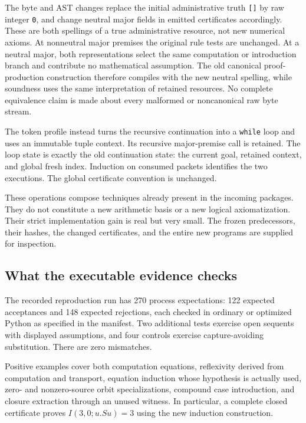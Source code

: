 The byte and AST changes replace the initial administrative truth
\texttt{[]} by raw integer \texttt{0}, and change neutral major fields
in emitted certificates accordingly. These are both spellings of a
true administrative resource, not new numerical axioms. At nonneutral
major premises the original rule tests are unchanged. At a neutral
major, both representations select the same computation or introduction
branch and contribute no mathematical assumption. The old canonical
proof-production construction therefore compiles with the new neutral
spelling, while soundness uses the same interpretation of retained
resources. No complete equivalence claim is made about every malformed
or noncanonical raw byte stream.

The token profile instead turns the recursive continuation into a
\texttt{while} loop and uses an immutable tuple context. Its recursive
major-premise call is retained. The loop state is exactly the old
continuation state: the current goal, retained context, and global fresh
index. Induction on consumed packets identifies the two executions.
The global certificate convention is unchanged.

These operations compose techniques already present in the incoming
packages. They do not constitute a new arithmetic basis or a new logical
axiomatization. Their strict implementation gain is real but very small.
The frozen predecessors, their hashes, the changed certificates, and the
entire new programs are supplied for inspection.

\subsection{What the executable evidence checks}

The recorded reproduction run has 270 process expectations: 122 expected
acceptances and 148 expected rejections, each checked in ordinary or
optimized Python as specified in the manifest. Two additional tests
exercise open sequents with displayed assumptions, and four controls
exercise capture-avoiding substitution. There are zero mismatches.

Positive examples cover both computation equations, reflexivity derived
from computation and transport, equation induction whose hypothesis is
actually used, zero- and nonzero-source orbit specializations, compound
case introduction, and closure extraction through an unused witness.
In particular, a complete closed certificate proves
$I(3,0;u.Su)=3$ using the new induction construction.

